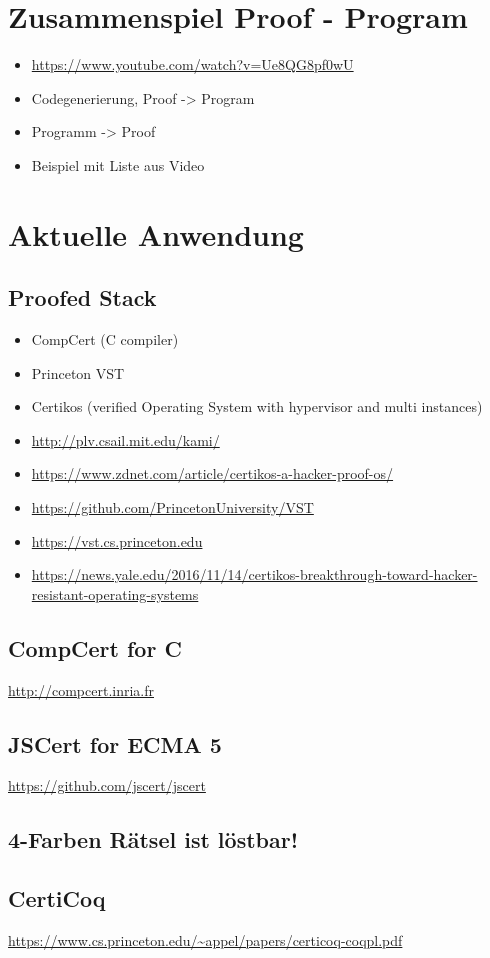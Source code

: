 \section{Zusammenspiel Proof - Program}
\begin{itemize}
	\item \url{https://www.youtube.com/watch?v=Ue8QG8pf0wU}
	\item Codegenerierung, Proof -> Program
	\item Programm -> Proof
	\item Beispiel mit Liste aus Video
\end{itemize}

\section{Aktuelle Anwendung}
\subsection{Proofed Stack}
\begin{itemize}
	\item CompCert (C compiler)
	\item Princeton VST
	\item Certikos (verified Operating System with hypervisor and multi instances)
	\item \url{http://plv.csail.mit.edu/kami/}
	\item \url{https://www.zdnet.com/article/certikos-a-hacker-proof-os/}
	\item \url{https://github.com/PrincetonUniversity/VST}
	\item \url{https://vst.cs.princeton.edu}
	\item \url{https://news.yale.edu/2016/11/14/certikos-breakthrough-toward-hacker-resistant-operating-systems}
\end{itemize}
\subsection{CompCert for C}
\url{http://compcert.inria.fr}
\subsection{JSCert for ECMA 5}
\url{https://github.com/jscert/jscert}
\subsection{4-Farben Rätsel ist löstbar!}
\subsection{CertiCoq}
\url{https://www.cs.princeton.edu/~appel/papers/certicoq-coqpl.pdf}

